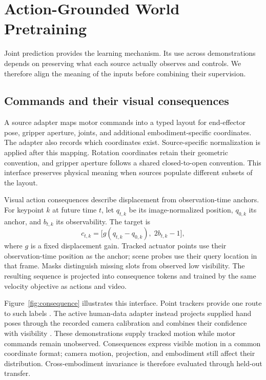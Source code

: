 \section{Action-Grounded World Pretraining}
\label{sec:pretrain}
Joint prediction provides the learning mechanism. Its use across demonstrations depends on
preserving what each source actually observes and controls. We therefore align the meaning of the
inputs before combining their supervision.

\subsection{Commands and their visual consequences}
A source adapter maps motor commands into a typed layout for end-effector pose, gripper aperture,
joints, and additional embodiment-specific coordinates. The adapter also records which coordinates
exist. Source-specific normalization is applied after this mapping. Rotation coordinates retain
their geometric convention, and gripper aperture follows a shared closed-to-open convention. This
interface preserves physical meaning when sources populate different subsets of the layout.

Visual action consequences describe displacement from observation-time anchors. For keypoint $k$ at
future time $t$, let $q_{t,k}$ be its image-normalized position, $q_{0,k}$ its anchor, and $b_{t,k}$
its observability. The target is
\begin{equation}
 c_{t,k}=\bigl[g(q_{t,k}-q_{0,k}),\;2b_{t,k}-1\bigr],
 \label{eq:consequence}
\end{equation}
where $g$ is a fixed displacement gain. Tracked actuator points use their observation-time position
as the anchor; scene probes use their query location in that frame. Masks distinguish missing slots
from observed low visibility. The resulting sequence is projected into consequence tokens and
trained by the same velocity objective as actions and video.

Figure~\ref{fig:consequence} illustrates this interface. Point trackers provide one route to such
labels \citep{cotracker}. The active human-data adapter instead projects supplied hand poses through
the recorded camera calibration and combines their confidence with visibility \citep{egodex}. These
demonstrations supply tracked motion while motor commands remain unobserved. Consequences express
visible motion in a common coordinate format; camera motion, projection, and embodiment still affect
their distribution. Cross-embodiment invariance is therefore evaluated through held-out transfer.

